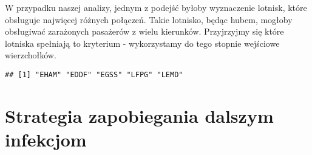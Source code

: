 \documentclass[
]{article}
\begin{document}
W przypadku naszej analizy, jednym z podejść byłoby wyznaczenie lotnisk,
które obsługuje najwięcej różnych połączeń. Takie lotnisko, będąc hubem,
mogłoby obsługiwać zarażonych pasażerów z wielu kierunków. Przyjrzyjmy
się które lotniska spełniają to kryterium - wykorzystamy do tego stopnie
wejściowe wierzchołków.

\begin{verbatim}
## [1] "EHAM" "EDDF" "EGSS" "LFPG" "LEMD"
\end{verbatim}

\hypertarget{strategia-zapobiegania-dalszym-infekcjom}{%
\section{Strategia zapobiegania dalszym
infekcjom}\label{strategia-zapobiegania-dalszym-infekcjom}}
\end{document}
